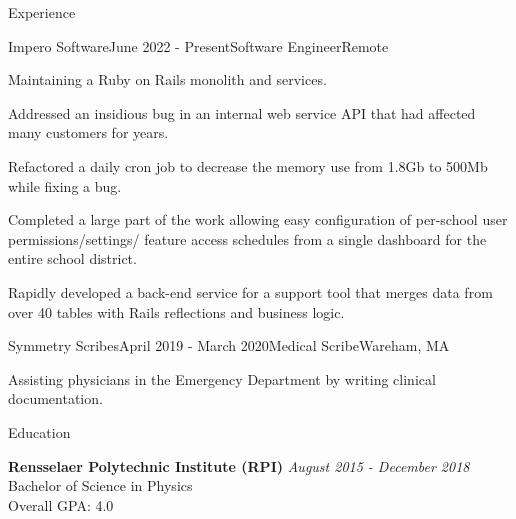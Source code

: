 \documentclass{resume}
\begin{document}
  \begin{rSection}{Experience}

  \begin{rSubsection}{Impero Software}{June 2022 - Present}{Software Engineer}{Remote}
      \item Maintaining a Ruby on Rails monolith and services. \item Addressed an insidious bug in an internal web service API that had affected many customers for years.
      \item Refactored a daily cron job to decrease the memory use from 1.8Gb to 500Mb while fixing a bug. 
      \item Completed a large part of the work allowing easy configuration of per-school user permissions/settings/ feature access schedules from a single dashboard for the entire school district.
      \item Rapidly developed a back-end service for a support tool that merges data from over 40 tables with Rails reflections and business logic.
  \end{rSubsection}

    \begin{rSubsection}{Symmetry Scribes}{April 2019 - March 2020}{Medical Scribe}{Wareham, MA}
    \item Assisting physicians in the Emergency Department by writing clinical documentation.
    \end{rSubsection}

  
  \end{rSection}

  \begin{rSection}{Education}



    {\bf Rensselaer Polytechnic Institute (RPI)} \hfill {\em August 2015 - December 2018} \\ 
    Bachelor of Science in Physics  \\
    Overall GPA: 4.0
  \end{rSection}
\end{document}
